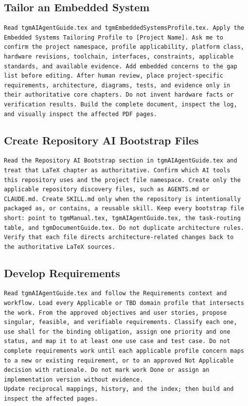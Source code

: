 \subsection{Tailor an Embedded System}
\begin{verbatim}
Read tgmAIAgentGuide.tex and tgmEmbeddedSystemsProfile.tex. Apply the
Embedded Systems Tailoring Profile to [Project Name]. Ask me to
confirm the project namespace, profile applicability, platform class,
hardware revisions, toolchain, interfaces, constraints, applicable
standards, and available evidence. Add embedded concerns to the gap
list before editing. After human review, place project-specific
requirements, architecture, diagrams, tests, and evidence only in
their authoritative core chapters. Do not invent hardware facts or
verification results. Build the complete document, inspect the log,
and visually inspect the affected PDF pages.
\end{verbatim}

\subsection{Create Repository AI Bootstrap Files}
\begin{verbatim}
Read the Repository AI Bootstrap section in tgmAIAgentGuide.tex and
treat that LaTeX chapter as authoritative. Confirm which AI tools
this repository uses and the project file namespace. Create only the
applicable repository discovery files, such as AGENTS.md or
CLAUDE.md. Create SKILL.md only when the repository is intentionally
packaged as, or contains, a reusable skill. Keep every bootstrap file
short: point to tgmManual.tex, tgmAIAgentGuide.tex, the task-routing
table, and tgmDocumentGuide.tex. Do not duplicate architecture rules.
Verify that each file directs architecture-related changes back to
the authoritative LaTeX sources.
\end{verbatim}

\subsection{Develop Requirements}
\begin{verbatim}
Read tgmAIAgentGuide.tex and follow the Requirements context and
workflow. Load every Applicable or TBD domain profile that intersects
the work. From the approved objectives and user stories, propose
singular, feasible, and verifiable requirements. Classify each one,
use shall for the binding obligation, assign one priority and one
status, and map it to at least one use case and test case. Do not
complete requirements work until each applicable profile concern maps
to a new or existing requirement, or to an approved Not Applicable
decision with rationale. Do not mark work Done or assign an
implementation version without evidence.
Update reciprocal mappings, history, and the index; then build and
inspect the affected pages.
\end{verbatim}

